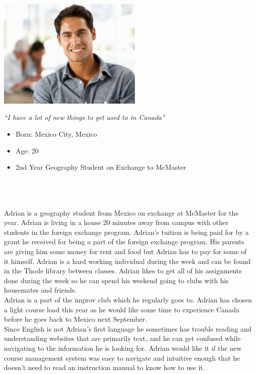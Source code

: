 \documentclass[12pt]{article}
\begin{document}
\begin{minipage}{70mm}
\includegraphics[width=70mm]{Adrian.png}
\begin{center}
\emph{``I have a lot of new things to get used to in Canada"}
\end{center}
\end{minipage}\hfill
\begin{minipage}{\textwidth}
\begin{itemize}
\item Born: Mexico City, Mexico
\item Age: 20
\item 2nd Year Geography Student on Exchange to McMaster
\end{itemize}
\end{minipage}\\\\\\

Adrian is a geography student from Mexico on exchange at McMaster for the year. Adrian is living in a house 20 minutes away from campus with other students in the foreign exchange program. Adrian's tuition is being paid for by a grant he received for being a part of the foreign exchange program. His parents are giving him some money for rent and food but Adrian has to pay for some of it himself. Adrian is a hard working individual during the week and can be found in the Thode library between classes. Adrian likes to get all of his assignments done during the week so he can spend his weekend going to clubs with his housemates and friends.\\

Adrian is a part of the improv club which he regularly goes to. Adrian has chosen a light course load this year as he would like some time to experience Canada before he goes back to Mexico next September.\\

Since English is not Adrian's first language he sometimes has trouble reading and understanding websites that are primarily text, and he can get confused while navigating to the information he is looking for. Adrian would like it if the new course management system was easy to navigate and intuitive enough that he doesn't need to read an instruction manual to know how to use it.
\end{document}
